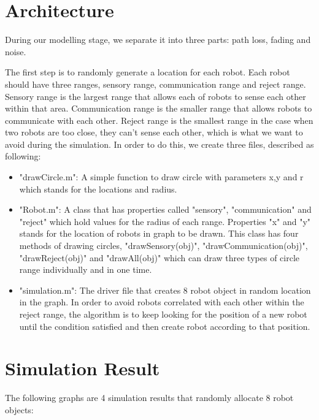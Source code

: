 \section{Architecture}
\label{sec:architecture}
	During our modelling stage, we separate it into three parts: path loss, fading and noise. \par
	The first step is to randomly generate a location for each robot. Each robot should have three ranges, sensory range, communication range and reject range. Sensory range is the largest range that allows each of robots to sense each other within that area. Communication range is the smaller range that allows robots to communicate with each other. Reject range is the smallest range in the case when two robots are too close, they can't sense each other, which is what we want to avoid during the simulation. In order to do this, we create three files, described as following:

\begin{itemize}
\item "drawCircle.m": A simple function to draw circle with parameters x,y and r which stands for the locations and radius. \item "Robot.m": A class that has properties called "sensory", "communication" and "reject" which hold values for the radius of each range. Properties "x" and "y" stands for the location of robots in graph to be drawn. This class has four methods of drawing circles, "drawSensory(obj)", "drawCommunication(obj)", "drawReject(obj)" and "drawAll(obj)" which can draw three types of circle range individually and in one time. 
\item "simulation.m": The driver file that creates 8 robot object in random location in the graph. In order to avoid robots correlated with each other within the reject range, the algorithm is to keep looking for the position of a new robot until the condition satisfied and then create robot according to that position. 
\end{itemize}

\section{Simulation Result}
\indent The following graphs are 4 simulation results that randomly allocate 8 robot objects:\\
 
